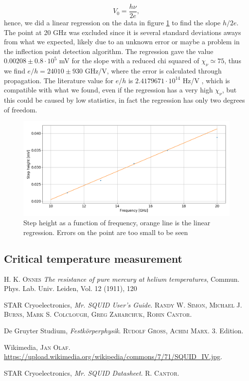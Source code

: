 \documentclass[a4paper,10pt]{article}
\begin{document}
\[V_0 = \frac{h\nu}{2e},\]
hence, we did a linear regression on the data in figure \ref{eh} to find the slope $h/2e$. The point at 20 GHz was excluded since it is several standard deviations aways from what we expected, likely due to an unknown error or maybe a problem in the inflection point detection algorithm. The regression gave the value $0.00208\pm 0.8\cdot 10^5$ mV for the slope with a reduced chi squared of $\chi_\nu \simeq 75$, thus we find $e/h = 24010 \pm 930$ GHz/V, where the error is calculated through propagation. The literature value for $e/h$ is $ 2.4179671\cdot 10^{14}$ Hz/V \cite{skriptum}, which is compatible with what we found, even if the regression has a very high $\chi_\nu$, but this could be caused by low statistics, in fact the regression has only two degrees of freedom.
\begin{figure}[H]
\centering
\includegraphics[width = \textwidth]{eh}
\caption{Step height as a function of frequency, orange line is the linear regression. Errors on the point are too small to be seen}\label{eh}
\end{figure}
\subsection{Critical temperature measurement}

\begin{thebibliography}{99}
 \textsc{H. K. Onnes} \textit{The resistance of pure mercury at helium temperatures}, Commun. Phys. Lab. Univ. Leiden, Vol. 12 (1911), 120 

STAR Cryoelectronics, \textit{Mr. SQUID User's  Guide}. \textsc{Randy W. Simon, Michael J. Burns, Mark S. Colclough, Greg Zaharchuk, Robin Cantor}. 

De Gruyter Studium, \textit{Festkörperphysik}. \textsc{Rudolf Gross, Achim Marx}. 3. Edition.

Wikimedia, \textsc{Jan Olaf}. \url{https://upload.wikimedia.org/wikipedia/commons/7/71/SQUID_IV.jpg}.

STAR Cryoelectronics, \textit{Mr. SQUID Datasheet}. \textsc{R. Cantor}. 

\end{thebibliography}
\end{document}
